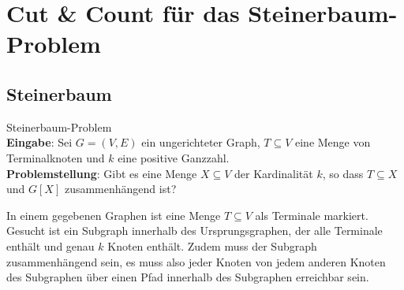 %
%
%
\chapter{Cut \& Count für das Steinerbaum-Problem}
\label{c:cc_steiner}

\section{Steinerbaum}
\label{sec:steiner}
\begin{definition}
Steinerbaum-Problem\\
\textbf{Eingabe}: Sei $G = (V, E)$ ein ungerichteter Graph, $T \subseteq V$ eine Menge von Terminalknoten und $k$ eine positive Ganzzahl. \\
\textbf{Problemstellung}: Gibt es eine Menge $X \subseteq V$ der Kardinalität $k$, so dass $T \subseteq X$ und $G[X]$ zusammenhängend ist?
\end{definition}

In einem gegebenen Graphen ist eine Menge $T \subseteq V$ als Terminale markiert. Gesucht ist ein Subgraph innerhalb des Ursprungsgraphen, der alle Terminale enthält und genau $k$ Knoten enthält. Zudem muss der Subgraph zusammenhängend sein, es muss also jeder Knoten von jedem anderen Knoten des Subgraphen über einen Pfad innerhalb des Subgraphen erreichbar sein.

